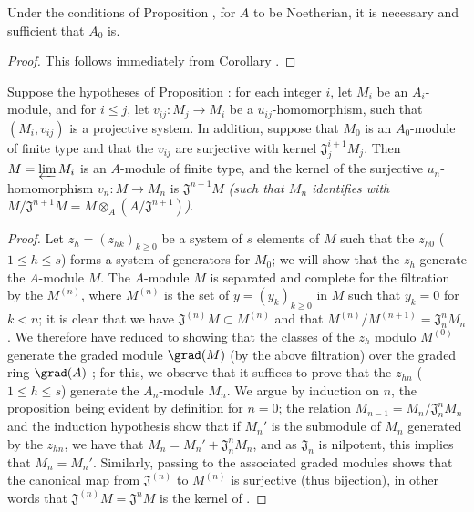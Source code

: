 \begin{corollary}[7.2.8]
\label{0.7.2.8}
Under the conditions of Proposition , for $A$ to
be Noetherian, it is necessary and sufficient that $A_0$ is.
\end{corollary}

\begin{proof}
This follows immediately from Corollary .
\end{proof}

\begin{proposition}[7.2.9]
\label{0.7.2.9}
Suppose the hypotheses of Proposition : for each integer $i$,
let $M_i$ be an $A_i$-module, and for $i\leq j$, let $v_{ij}:M_j\to M_i$ be a
$u_{ij}$-homomorphism, such that $(M_i,v_{ij})$ is a projective system. In addition, suppose
that $M_0$ is an $A_0$-module of finite type and that the $v_{ij}$ are surjective with kernel
$\mathfrak{J}_j^{i+1}M_j$. Then $M=\varprojlim M_i$ is an $A$-module of finite type, and the
kernel of the surjective $u_n$-homomorphism $v_n:M\to M_n$ is $\mathfrak{J}^{n+1}M$
\emph{(such that $M_n$ identifies with
$M/\mathfrak{J}^{n+1}M=M\otimes_A(A/\mathfrak{J}^{n+1})$)}.
\end{proposition}

\begin{proof}
Let $z_h=(z_{hk})_{k\geq 0}$ be a system of $s$ elements of $M$ such that the $z_{h0}$
($1\leq h\leq s$) forms a system of generators for $M_0$; we will show that the
$z_h$ generate the $A$-module $M$. The $A$-module $M$ is separated and complete for the
filtration by the $M^{(n)}$, where $M^{(n)}$ is the set of $y=(y_k)_{k\geq 0}$ in $M$
such that $y_k=0$ for $k<n$; it is clear that we have $\mathfrak{J}^{(n)}M\subset M^{(n)}$
and that $M^{(n)}/M^{(n+1)}=\mathfrak{J}_n^n M_n$. We therefore have reduced to showing that
the classes of the $z_h$ modulo $M^{(0)}$ generate the graded module $\grad(M)$ (by the
above filtration) over the graded ring $\grad(A)$ \cite[p.~18--06, lemme]{I-1}; for this, we
observe that it suffices to prove that the $z_{hn}$ ($1\leq h\leq s$) generate the
$A_n$-module $M_n$. We argue by induction on $n$, the proposition being evident by definition
for $n=0$; the relation $M_{n-1}=M_n/\mathfrak{J}_n^n M_n$ and the induction hypothesis show
that if $M_n'$ is the submodule of $M_n$ generated by the $z_{hn}$, we have that
$M_n=M_n'+\mathfrak{J}_n^n M_n$, and as $\mathfrak{J}_n$ is nilpotent, this implies that
$M_n=M_n'$. Similarly, passing to the associated graded modules shows that the canonical map
from $\mathfrak{J}^{(n)}$ to $M^{(n)}$ is surjective (thus bijection), in other words that
$\mathfrak{J}^{(n)}M=\mathfrak{J}^n M$ is the kernel of .
\end{proof}

